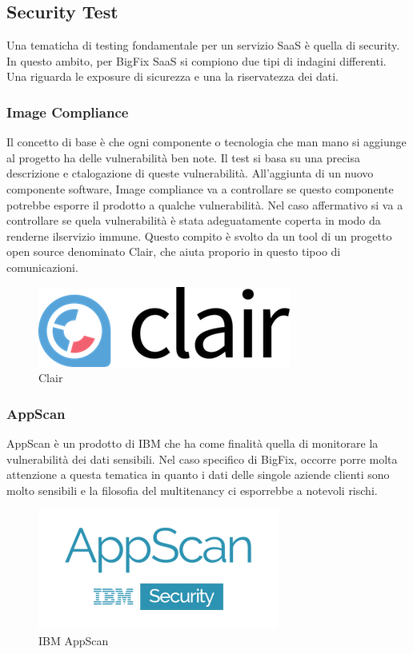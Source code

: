 \subsection{Security Test}
Una tematicha di testing fondamentale per un servizio SaaS è quella di security. In questo ambito, per BigFix SaaS si compiono due tipi di indagini differenti. Una riguarda le exposure di sicurezza e una la riservatezza dei dati.
\subsubsection{Image Compliance}
Il concetto di base è che ogni componente o tecnologia che man mano si aggiunge al progetto ha delle vulnerabilità ben note. Il test si basa su una precisa descrizione e ctalogazione di queste vulnerabilità. All'aggiunta di un nuovo componente software, Image compliance va a controllare se questo componente potrebbe esporre il prodotto a qualche vulnerabilità. Nel caso affermativo si va a controllare se quela vulnerabilità è stata adeguatamente coperta in modo da renderne ilservizio immune. Questo compito è svolto da un tool di un progetto open source denominato Clair, che aiuta proporio in questo tipoo di comunicazioni.
\begin{figure}[h]
	\centering
	\includegraphics[width=0.5\linewidth]{capitoli/imgs/clair}
	\caption{Clair}
	\label{fig:clair}
\end{figure}
\subsubsection{AppScan}
AppScan è un prodotto di IBM che ha come finalità quella di monitorare la vulnerabilità dei dati sensibili. Nel caso specifico di BigFix, occorre porre molta attenzione a questa tematica in quanto i dati delle singole aziende clienti sono molto sensibili e la filosofia del multitenancy ci esporrebbe a notevoli rischi. 
\begin{figure}[h]
	\centering
	\includegraphics[width=0.5\linewidth]{capitoli/imgs/ibm-appscan-logo}
	\caption{IBM AppScan}
	\label{fig:ibm-appscan-logo}
\end{figure}

